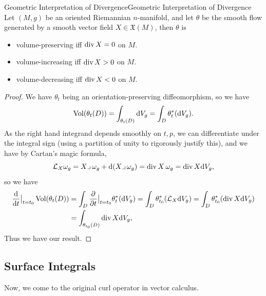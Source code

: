 \documentclass[../main.tex]{subfiles}
\begin{document}
\begin{proposition}{Geometric Interpretation of Divergence}{Geometric Interpretation of Divergence}
  Let $(M,g)$ be an oriented Riemannian $n$-manifold, and let $\theta$ be the smooth flow generated by a smooth vector field $X \in \mathfrak{X}(M)$, then $\theta$ is
  \begin{itemize}
    \item volume-preserving iff $\operatorname{div} X = 0$ on $M$.
    \item volume-increasing iff $\operatorname{div} X > 0$ on $M$.
    \item volume-decreasing iff $\operatorname{div} X < 0$ on $M$.
  \end{itemize}
\end{proposition}
\begin{proof}
  We have $\theta_t$ being an orientation-preserving diffeomorphism, so we have
  \begin{equation*}
    \operatorname{Vol} (\theta_t(D)) = \int_{\theta_t(D)} \mathrm{d} V_g = \int_D \theta_t^* (\mathrm{d} V_g).
  \end{equation*}
  As the right hand integrand depends smoothly on $t,p$, we can differentiate under the integral sign (using a partition of unity to rigorously justify this), and we have by Cartan's magic formula,
  \begin{equation*}
    \mathcal{L}_X \omega_g = X \lrcorner \, \omega_g + \mathrm{d} (X \lrcorner \, \omega_g) = \operatorname{div} X \, \omega_g = \operatorname{div} X \mathrm{d} V_g,
  \end{equation*}
  so we have
  \begin{equation*}
    \begin{aligned}
      \frac{\mathrm{d} }{\mathrm{d} t} \big|_{t=t_0} \operatorname{Vol} (\theta_t(D)) &= \int_D \frac{\partial}{\partial t} \big|_{t=t_0} \theta_t^* (\mathrm{d} V_g) = \int_D \theta_{t_0}^* (\mathcal{L}_X \mathrm{d} V_g) = \int_D \theta_{t_0}^* (\operatorname{div} X \mathrm{d} V_g)\\
      &= \int_{\theta_{t_0}(D)} \operatorname{div} X \mathrm{d} V_g,
    \end{aligned}
  \end{equation*}
  Thus we have our result.
\end{proof}

\subsection{Surface Integrals}
Now, we come to the original curl operator in vector calculus.
\end{document}
